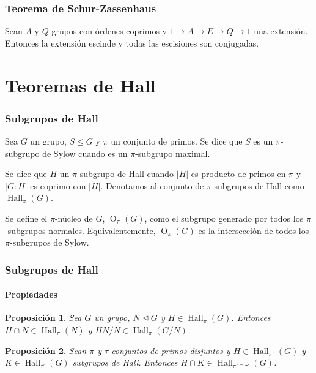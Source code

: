 \documentclass[
	11pt, %
]{beamer}
\DeclareMathOperator{\SylowSubgroup}{Syl}
\DeclareMathOperator{\HallSubgroup}{Hall}
\DeclareMathOperator{\OSubgroup}{O}
\newcommand{\Syl}[2]{\SylowSubgroup_{#1}(#2)}
\newcommand{\Hall}[2]{\HallSubgroup_{#1}(#2)}
\newcommand{\Core}[2]{\OSubgroup_{#1}(#2)}
\newcommand{\norm}{\trianglelefteq}
\newcommand{\ord}[1]{\left|#1\right|}%
\newcommand{\extension}[5]{1\xrightarrow{} #3 \xrightarrow{#1} #4\xrightarrow{#2} #5 \xrightarrow{} 1}
\newtheorem{proposition}{Proposici\'on}
\begin{document}
\begin{frame}
	\frametitle{Teorema de Schur-Zassenhaus}
	\begin{theorem}
		Sean $A$ y $Q$ grupos con órdenes coprimos y $\extension {}{} A E Q$ una extensión. Entonces la extensión escinde y todas las escisiones son conjugadas.
	\end{theorem}
\end{frame}



\section{Teoremas de Hall}

\begin{frame}
	\frametitle{Subgrupos de Hall}
	
	\begin{definition}
		Sea $G$ un grupo, $S\leq G$ y $\pi$ un conjunto de primos. Se dice que $S$ es un $\pi$-subgrupo de Sylow cuando es un $\pi$-subgrupo maximal. %
	\end{definition}
	\pause
	\begin{definition}
		Se dice que $H$ un $\pi$-subgrupo de Hall cuando $\ord{H}$ es producto de primos en $\pi$ y $\ord{G:H}$ es coprimo con $\ord H$. Denotamos al conjunto de $\pi$-subgrupos de Hall como $\Hall \pi G$.
	\end{definition}
	\pause
	\smallskip %
	
	\begin{definition}
		Se define el $\pi$-núcleo de $G$, $\Core \pi G$, como el subgrupo generado por todos los $\pi$-subgrupos normales. Equivalentemente, $\Core \pi G$ es la intersección de todos los $\pi$-subgrupos de Sylow.
	\end{definition}  
	
\end{frame}

\begin{frame}
	\frametitle{Subgrupos de Hall}
	\framesubtitle{Propiedades}

	\begin{proposition}
		Sea $G$ un grupo, $N\norm G$ y $H\in \Hall \pi G$. Entonces $H\cap N \in \Hall \pi {N}$ y $HN/N\in \Hall \pi{ G/N}$.
	\end{proposition}
	
	\begin{proposition}
		Sean $\pi$ y $\tau$ conjuntos de primos disjuntos y $H\in \Hall {\pi'} G$ y $K\in \Hall {\tau'} G$ subgrupos de Hall. Entonces $H\cap K\in \Hall {\pi'\cap\tau'} G$.
	\end{proposition}
	
\end{frame}
\end{document}
